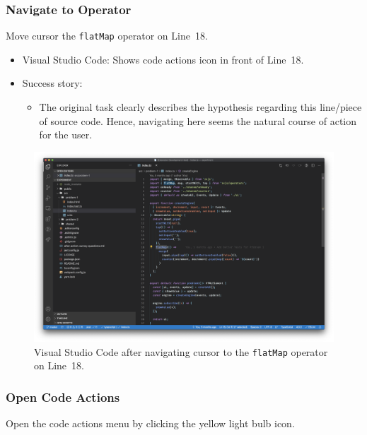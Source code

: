 \documentclass[sigplan,screen,nonacm,review]{acmart}
\begin{document}
\subsubsection{Navigate to Operator}
Move cursor the \texttt{flatMap} operator on Line~18.

\begin{itemize}
	\item Visual Studio Code: Shows code actions icon in front of Line~18.
	\item Success story:
	      \begin{itemize}
	      	\item The original task clearly describes the hypothesis regarding this line/piece of source code. Hence, navigating here seems the natural course of action for the user.
	      \end{itemize}
\end{itemize}

\begin{figure}[ht]
	\centering
	\includegraphics[width=\columnwidth]{walkthrough-screenshots/step2.png}
	\Description{}
	\caption{Visual Studio Code after navigating cursor to the \texttt{flatMap} operator on Line~18.}
	\label{fig:walkthrough-screesnhot-step-2}
\end{figure}


\subsubsection{Open Code Actions}
Open the code actions menu by clicking the yellow light bulb icon.
\end{document}
